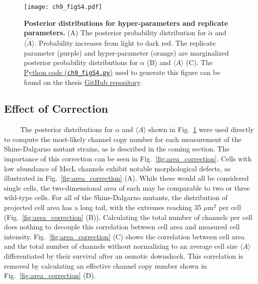 \documentclass[12pt]{caltech_thesis}
\begin{document}
\hypertarget{fig:mscl_posterior_samples}{%
\begin{figure}
\centering
\texttt{[image: ch9\_figS4.pdf]}
\caption[{Posterior distributions for hyper-parameters and replicate
parameters.}]{\textbf{Posterior distributions for hyper-parameters and
replicate parameters.} (A) The posterior probability distribution for
\(\tilde{\alpha}\) and \(\tilde{\langle A \rangle}\). Probability
increases from light to dark red. The replicate parameter (purple) and
hyper-parameter (orange) are marginalized posterior probability
distributions for \(\alpha\) (B) and \(\langle A \rangle\) (C). The
\href{https://github.com/gchure/phd/blob/master/src/chapter_09/code/ch9_figS4.py}{Python
code (\texttt{ch9\_figS4.py})} used to generate this figure can be found
on the thesis \href{https://github.com/gchure/phd}{GitHub repository}.}
\label{fig:mscl_posterior_samples}
\end{figure}
}

\hypertarget{effect-of-correction}{%
\subsection{Effect of Correction}\label{effect-of-correction}}

~~~~ The posterior distributions for \(\alpha\) and
\(\langle A \rangle\) shown in Fig.~\ref{fig:mscl_posterior_samples}
were used directly to compute the most-likely channel copy number for
each measurement of the Shine-Dalgarno mutant strains, as is described
in the coming section. The importance of this correction can be seen in
Fig.~\ref{fig:area_correction}. Cells with low abundance of MscL
channels exhibit notable morphological defects, as illustrated in
Fig.~\ref{fig:area_correction} (A). While these would all be considered
single cells, the two-dimensional area of each may be comparable to two
or three wild-type cells. For all of the Shine-Dalgarno mutants, the
distribution of projected cell area has a long tail, with the extremes
reaching 35 \(\mu\text{m}^2\) per cell (Fig.~\ref{fig:area_correction}
(B)). Calculating the total number of channels per cell does nothing to
decouple this correlation between cell area and measured cell intensity.
Fig.~\ref{fig:area_correction} (C) shows the correlation between cell
area and the total number of channels without normalizing to an average
cell size \(\langle A \rangle\) differentiated by their survival after
an osmotic downshock. This correlation is removed by calculating an
effective channel copy number shown in Fig.~\ref{fig:area_correction}
(D).
\end{document}
